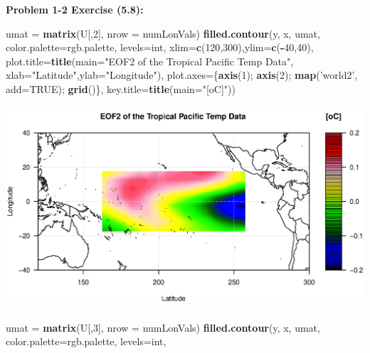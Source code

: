 \documentclass[11pt]{article}
\newenvironment{problem}[1]{\textbf{Problem #1:}}{\newpage}
\newenvironment{Shaded}{\begin{snugshade}}{\end{snugshade}}
\newcommand{\DataTypeTok}[1]{\textcolor[rgb]{0.13,0.29,0.53}{#1}}
\newcommand{\DecValTok}[1]{\textcolor[rgb]{0.00,0.00,0.81}{#1}}
\newcommand{\KeywordTok}[1]{\textcolor[rgb]{0.13,0.29,0.53}{\textbf{#1}}}
\newcommand{\NormalTok}[1]{#1}
\newcommand{\OperatorTok}[1]{\textcolor[rgb]{0.81,0.36,0.00}{\textbf{#1}}}
\newcommand{\OtherTok}[1]{\textcolor[rgb]{0.56,0.35,0.01}{#1}}
\newcommand{\StringTok}[1]{\textcolor[rgb]{0.31,0.60,0.02}{#1}}
\begin{document}
\begin{problem}{1-2 Exercise (5.8)}
\begin{enumerate}[label = (\alph*)]
\newpage
\begin{Shaded}
\begin{Highlighting}[]
\NormalTok{umat =}\StringTok{ }\KeywordTok{matrix}\NormalTok{(U[,}\DecValTok{2}\NormalTok{], }\DataTypeTok{nrow =}\NormalTok{ numLonVals)}
\KeywordTok{filled.contour}\NormalTok{(y, x, umat, }\DataTypeTok{color.palette=}\NormalTok{rgb.palette, }\DataTypeTok{levels=}\NormalTok{int,}
               \DataTypeTok{xlim=}\KeywordTok{c}\NormalTok{(}\DecValTok{120}\NormalTok{,}\DecValTok{300}\NormalTok{),}\DataTypeTok{ylim=}\KeywordTok{c}\NormalTok{(}\OperatorTok{-}\DecValTok{40}\NormalTok{,}\DecValTok{40}\NormalTok{),}
               \DataTypeTok{plot.title=}\KeywordTok{title}\NormalTok{(}\DataTypeTok{main=}\StringTok{"EOF2 of the Tropical Pacific Temp Data"}\NormalTok{,}
                                \DataTypeTok{xlab=}\StringTok{"Latitude"}\NormalTok{,}\DataTypeTok{ylab=}\StringTok{"Longitude"}\NormalTok{),}
               \DataTypeTok{plot.axes=}\NormalTok{\{}\KeywordTok{axis}\NormalTok{(}\DecValTok{1}\NormalTok{); }\KeywordTok{axis}\NormalTok{(}\DecValTok{2}\NormalTok{); }\KeywordTok{map}\NormalTok{(}\StringTok{'world2'}\NormalTok{, }\DataTypeTok{add=}\OtherTok{TRUE}\NormalTok{); }\KeywordTok{grid}\NormalTok{()\},}
               \DataTypeTok{key.title=}\KeywordTok{title}\NormalTok{(}\DataTypeTok{main=}\StringTok{"[oC]"}\NormalTok{))}
\end{Highlighting}
\end{Shaded}
\includegraphics[height = 7.5cm]{Figures/Prob1/EOF2}
\begin{Shaded}
\begin{Highlighting}[]
\NormalTok{umat =}\StringTok{ }\KeywordTok{matrix}\NormalTok{(U[,}\DecValTok{3}\NormalTok{], }\DataTypeTok{nrow =}\NormalTok{ numLonVals)}
\KeywordTok{filled.contour}\NormalTok{(y, x, umat, }\DataTypeTok{color.palette=}\NormalTok{rgb.palette, }\DataTypeTok{levels=}\NormalTok{int,}

\end{Highlighting}
\end{Shaded}
\end{enumerate}
\end{problem}
\end{document}
